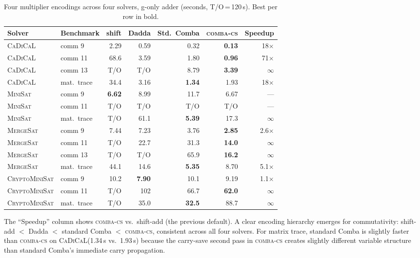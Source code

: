 \documentclass[a4paper]{ceurart}
\newcommand{\combacs}{\textsc{comba-cs}\xspace}
\newcommand{\cadical}{\textsc{CaDiCaL}\xspace}
\newcommand{\minisat}{\textsc{MiniSat}\xspace}
\newcommand{\mergesat}{\textsc{MergeSat}\xspace}
\newcommand{\cryptominisat}{\textsc{CryptoMiniSat}\xspace}
\begin{document}
\begin{table}[ht]
\caption{Four multiplier encodings across four solvers, g-only adder
  (seconds, T/O\,=\,120\,s). Best per row in bold.}
\label{tab:allencodings}
\centering
\small
\begin{tabular}{llrrrrr}
\toprule
Solver & Benchmark & shift & Dadda & Std.\ Comba & \combacs & Speedup \\
\midrule
\cadical & comm 9    & 2.29  & 0.59  & 0.32  & \textbf{0.13} & 18$\times$ \\
\cadical & comm 11   & 68.6  & 3.59  & 1.80  & \textbf{0.96} & 71$\times$ \\
\cadical & comm 13   & T/O   & T/O   & 8.79  & \textbf{3.39} & $\infty$ \\
\cadical & mat.\ trace & 34.4 & 3.16 & \textbf{1.34} & 1.93 & 18$\times$ \\
\midrule
\minisat & comm 9    & \textbf{6.62} & 8.99 & 11.7 & 6.67 & --- \\
\minisat & comm 11   & T/O   & T/O   & T/O   & T/O & --- \\
\minisat & mat.\ trace & T/O & 61.1  & \textbf{5.39} & 17.3 & $\infty$ \\
\midrule
\mergesat & comm 9   & 7.44  & 7.23  & 3.76  & \textbf{2.85} & 2.6$\times$ \\
\mergesat & comm 11  & T/O   & 22.7  & 31.3  & \textbf{14.0} & $\infty$ \\
\mergesat & comm 13  & T/O   & T/O   & 65.9  & \textbf{16.2} & $\infty$ \\
\mergesat & mat.\ trace & 44.1 & 14.6 & \textbf{5.35} & 8.70 & 5.1$\times$ \\
\midrule
\cryptominisat & comm 9 & 10.2 & \textbf{7.90} & 10.1 & 9.19 & 1.1$\times$ \\
\cryptominisat & comm 11 & T/O & 102 & 66.7 & \textbf{62.0} & $\infty$ \\
\cryptominisat & mat.\ trace & T/O & 35.0 & \textbf{32.5} & 88.7 & $\infty$ \\
\bottomrule
\end{tabular}
\end{table}

The ``Speedup'' column shows \combacs vs.\ shift-add (the previous
default). A clear encoding hierarchy emerges for commutativity:
shift-add $<$ Dadda $<$ standard Comba $<$ \combacs, consistent
across all four solvers. For matrix trace, standard Comba is slightly
faster than \combacs on \cadical (1.34\,s vs.\ 1.93\,s) because the
carry-save second pass in \combacs creates slightly different
variable structure than standard Comba's immediate carry propagation.
\end{document}
